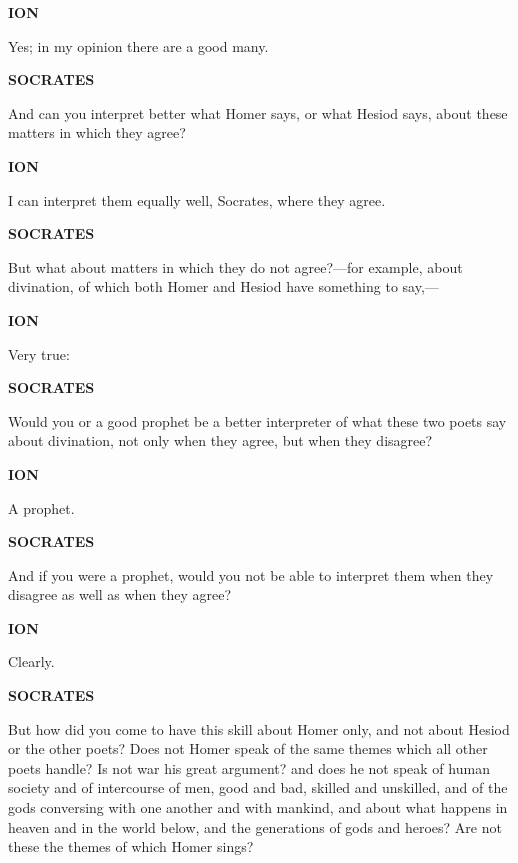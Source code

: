 \documentclass[11pt,letter]{article}
\begin{document}
\par \textbf{ION}
\par   Yes; in my opinion there are a good many.

\par \textbf{SOCRATES}
\par   And can you interpret better what Homer says, or what Hesiod says, about these matters in which they agree?

\par \textbf{ION}
\par   I can interpret them equally well, Socrates, where they agree.

\par \textbf{SOCRATES}
\par   But what about matters in which they do not agree?—for example, about divination, of which both Homer and Hesiod have something to say,—

\par \textbf{ION}
\par   Very true:

\par \textbf{SOCRATES}
\par   Would you or a good prophet be a better interpreter of what these two poets say about divination, not only when they agree, but when they disagree?

\par \textbf{ION}
\par   A prophet.

\par \textbf{SOCRATES}
\par   And if you were a prophet, would you not be able to interpret them when they disagree as well as when they agree?

\par \textbf{ION}
\par   Clearly.

\par \textbf{SOCRATES}
\par   But how did you come to have this skill about Homer only, and not about Hesiod or the other poets? Does not Homer speak of the same themes which all other poets handle? Is not war his great argument? and does he not speak of human society and of intercourse of men, good and bad, skilled and unskilled, and of the gods conversing with one another and with mankind, and about what happens in heaven and in the world below, and the generations of gods and heroes? Are not these the themes of which Homer sings?
\end{document}
